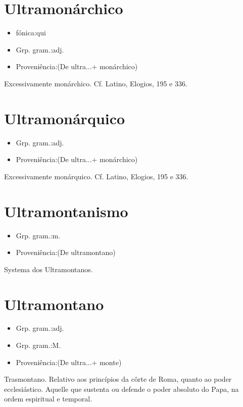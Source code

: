 \documentclass{article}
\begin{document}
\section{Ultramonárchico}
\begin{itemize}
\item {fónica:qui}
\end{itemize}
\begin{itemize}
\item {Grp. gram.:adj.}
\end{itemize}
\begin{itemize}
\item {Proveniência:(De \textunderscore ultra...\textunderscore  + \textunderscore monárchico\textunderscore )}
\end{itemize}
Excessivamente monárchico. Cf. Latino, \textunderscore Elogios\textunderscore , 195 e 336.
\section{Ultramonárquico}
\begin{itemize}
\item {Grp. gram.:adj.}
\end{itemize}
\begin{itemize}
\item {Proveniência:(De \textunderscore ultra...\textunderscore  + \textunderscore monárchico\textunderscore )}
\end{itemize}
Excessivamente monárquico. Cf. Latino, \textunderscore Elogios\textunderscore , 195 e 336.
\section{Ultramontanismo}
\begin{itemize}
\item {Grp. gram.:m.}
\end{itemize}
\begin{itemize}
\item {Proveniência:(De \textunderscore ultramontano\textunderscore )}
\end{itemize}
Systema dos Ultramontanos.
\section{Ultramontano}
\begin{itemize}
\item {Grp. gram.:adj.}
\end{itemize}
\begin{itemize}
\item {Grp. gram.:M.}
\end{itemize}
\begin{itemize}
\item {Proveniência:(De \textunderscore ultra...\textunderscore  + \textunderscore monte\textunderscore )}
\end{itemize}
Trasmontano.
Relativo aos princípios da côrte de Roma, quanto ao poder ecclesiástico.
Aquelle que sustenta ou defende o poder absoluto do Papa, na ordem espiritual e temporal.
\end{document}
